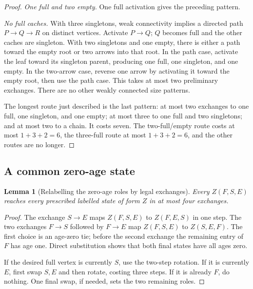 \documentclass[11pt]{article}
\newtheorem{lemma}[theorem]{Lemma}
\begin{document}
\begin{proof}
\emph{One full and two empty.}
One full activation gives the preceding pattern.

\emph{No full caches.}
With three singletons, weak connectivity implies a directed path
$P\to Q\to R$ on distinct vertices. Activate $P\to Q$; $Q$ becomes
full and the other caches are singleton.
With two singletons and one empty, there is either a path toward
the empty root or two arrows into that root. In the path case,
activate the leaf toward its singleton parent, producing one full,
one singleton, and one empty. In the two-arrow case, reverse one
arrow by activating it toward the empty root, then use the path
case. This takes at most two preliminary exchanges.
There are no other weakly connected size patterns.

The longest route just described is the last pattern: at most two
exchanges to one full, one singleton, and one empty; at most three
to one full and two singletons; and at most two to a chain.
It costs seven. The two-full/empty route costs at most
$1+3+2=6$, the three-full route at most $1+3+2=6$, and the
other routes are no longer.
\end{proof}

\subsection{A common zero-age state}

\begin{lemma}[Relabelling the zero-age roles by legal exchanges]
\label{lem:roles}
Every $Z(F,S,E)$ reaches every prescribed labelled state of form
$Z$ in at most four exchanges.
\end{lemma}
\begin{proof}
The exchange $S\to E$ maps
$Z(F,S,E)$ to $Z(F,E,S)$ in one step.
The two exchanges $F\to S$ followed by $F\to E$ map
$Z(F,S,E)$ to $Z(S,E,F)$. The first choice is an age-zero tie;
before the second exchange the remaining entry of $F$ has age one.
Direct substitution shows that both final states have all ages zero.

If the desired full vertex is currently $S$, use the two-step
rotation. If it is currently $E$, first swap $S,E$ and then
rotate, costing three steps. If it is already $F$, do nothing.
One final swap, if needed, sets the two remaining roles.
\end{proof}
\end{document}
